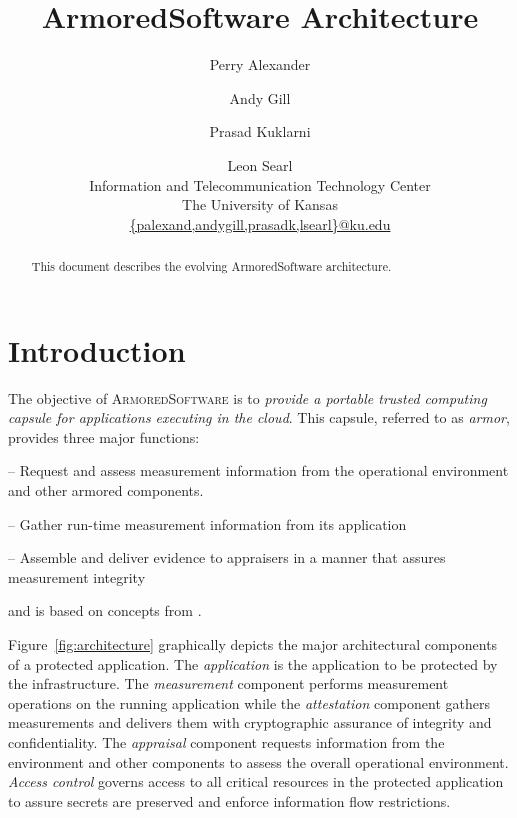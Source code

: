 \documentclass[10pt]{article}
\title{ArmoredSoftware Architecture}
\author{Perry Alexander \and Andy Gill \and Prasad Kuklarni \and Leon
  Searl \\
Information and Telecommunication Technology Center \\
The University of Kansas \\
\url{{palexand,andygill,prasadk,lsearl}@ku.edu}}
\begin{document}
\maketitle
\tableofcontents
\listoffigures
\listoftables

\begin{abstract}
  This document describes the evolving ArmoredSoftware architecture.
\end{abstract}

\section{Introduction}

The objective of \textsc{ArmoredSoftware} is to \emph{provide a portable
trusted computing capsule for applications executing in the cloud}.
This capsule, referred to as \emph{armor}, provides three major
functions:

\begin{description}
  \parskip=0pt\itemsep=0pt
\item[Appraisal] -- Request and assess measurement information from
  the operational environment and other armored components.
\item[Measurement] -- Gather run-time measurement information from its
  application
\item[Attestation] -- Assemble and deliver evidence to appraisers in a
  manner that assures measurement integrity
\end{description}

\noindent and is based on concepts from \citet{Coker::Principles-of-R}. 

Figure~\ref{fig:architecture} graphically depicts the major
architectural components of a protected application.  The
\emph{application} is the application to be protected by the
infrastructure.  The \emph{measurement} component performs measurement
operations on the running application while the \emph{attestation}
component gathers measurements and delivers them with cryptographic
assurance of integrity and confidentiality.  The \emph{appraisal}
component requests information from the environment and other
components to assess the overall operational environment.
\emph{Access control} governs access to all critical resources in the
protected application to assure secrets are preserved and enforce
information flow restrictions.
\end{document}
